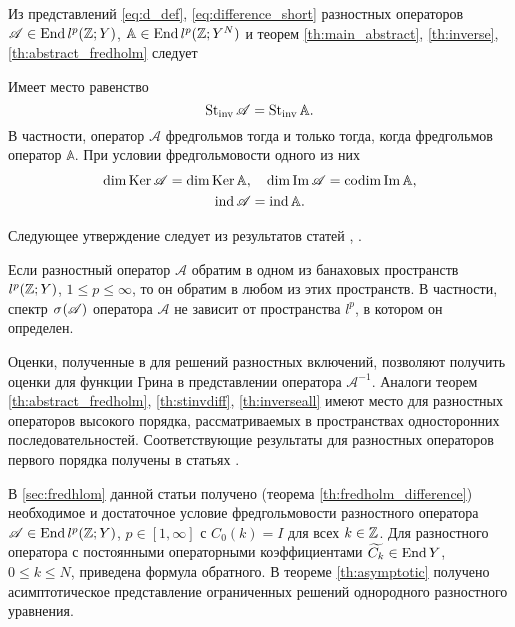 Из представлений \eqref{eq:d_def}, \eqref{eq:difference_short} разностных операторов $\mathcal A \in \operatorname{End} l^p(\mathbb{Z}; Y)$, $\mathbb A \in \operatorname{End} l^p(\mathbb{Z}; Y^N)$ и теорем \ref{th:main_abstract}, \ref{th:inverse}, \ref{th:abstract_fredholm} следует
\begin{theorem}\label{th:stinvdiff}
    Имеет место равенство
    \[ \operatorname{St_{inv}} \mathcal A = \operatorname{St_{inv}} \mathbb A. \]
    В частности, оператор $\mathcal A$ фредгольмов тогда и только тогда, когда фредгольмов оператор $\mathbb A$. При условии фредгольмовости одного из них
    \begin{gather*}
    \dim \operatorname{Ker} \mathcal A = \dim \operatorname{Ker} \mathbb A, \quad \dim \operatorname{Im} \mathcal A = \operatorname{codim} \operatorname{Im} \mathbb A, \\
    \operatorname{ind} \mathcal A = \operatorname{ind} \mathbb A.
    \end{gather*}
\end{theorem}

Следующее утверждение следует из результатов статей \cite{inverse1992}, \cite{memory2014}.
\begin{theorem}\label{th:inverseall}
    Если разностный оператор $\mathcal A$ обратим в одном из банаховых пространств $l^p(\mathbb{Z}; Y)$, $1 \leq p \leq \infty$, то он обратим в любом из этих пространств. В частности, спектр $\spectrum{\mathcal{A}}$ оператора $\mathcal A$ не зависит от пространства $l^p$, в котором он определен.
\end{theorem}

Оценки, полученные в \cite{green2015} для решений разностных включений, позволяют получить оценки для функции Грина в представлении оператора $\mathcal A^{-1}$. Аналоги теорем \ref{th:abstract_fredholm}, \ref{th:stinvdiff}, \ref{th:inverseall} имеют место для разностных операторов высокого порядка, рассматриваемых в пространствах односторонних последовательностей. Соответствующие результаты для разностных операторов первого порядка получены в статьях \cite{inverse1992,Bas13}.

В \textsection \ref{sec:fredhlom} данной статьи получено (теорема \ref{th:fredholm_difference}) необходимое и достаточное условие фредгольмовости разностного оператора $\mathcal A \in \operatorname{End} l^p(\mathbb{Z}; Y)$, $p \in [1, \infty]$ с $C_0(k) = I$ для всех $k \in \mathbb{Z}$. Для разностного оператора с постоянными операторными коэффициентами $\widetilde{C_k} \in \operatorname{End} Y$, $0 \leq k \leq N$, приведена формула обратного. В теореме \ref{th:asymptotic} получено асимптотическое представление ограниченных решений однородного разностного уравнения.
